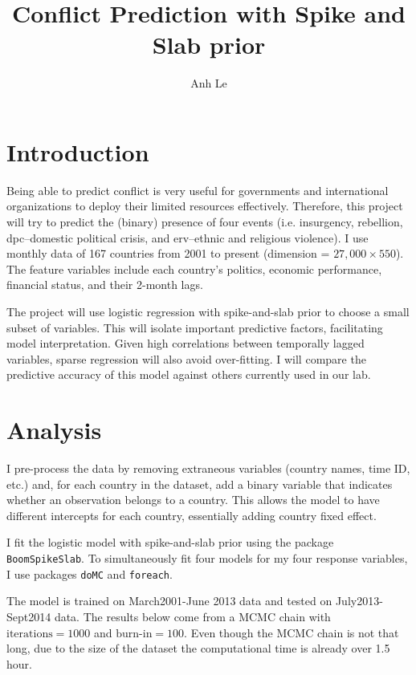 \documentclass[12pt]{article}
\title{Conflict Prediction with Spike and Slab prior}
\author{Anh Le}
\begin{document}
\maketitle

\section*{Introduction}

Being able to predict conflict is very useful for governments and international organizations to deploy their limited resources effectively. Therefore, this project will try to predict the (binary) presence of four events (i.e. insurgency, rebellion, dpc--domestic political crisis, and erv--ethnic and religious violence). I use monthly data of 167 countries from 2001 to present (dimension = $27,000 \times 550$). The feature variables include each country's politics, economic performance, financial status, and their 2-month lags.

The project will use logistic regression with spike-and-slab prior to choose a small subset of variables. This will isolate important predictive factors, facilitating model interpretation. Given high correlations between temporally lagged variables, sparse regression will also avoid over-fitting. I will compare the predictive accuracy of this model against others currently used in our lab.

\section*{Analysis}

I pre-process the data by removing extraneous variables (country names, time ID, etc.) and, for each country in the dataset, add a binary variable that indicates whether an observation belongs to a country. This allows the model to have different intercepts for each country, essentially adding country fixed effect.

I fit the logistic model with spike-and-slab prior using the package \verb|BoomSpikeSlab|. To simultaneously fit four models for my four response variables, I use packages \verb|doMC| and \verb|foreach|. 

The model is trained on March2001-June 2013 data and tested on July2013-Sept2014 data. The results below come from a MCMC chain with $\text{iterations}=1000$ and $\text{burn-in}=100$. Even though the MCMC chain is not that long, due to the size of the dataset the computational time is already over 1.5 hour. 
\end{document}
